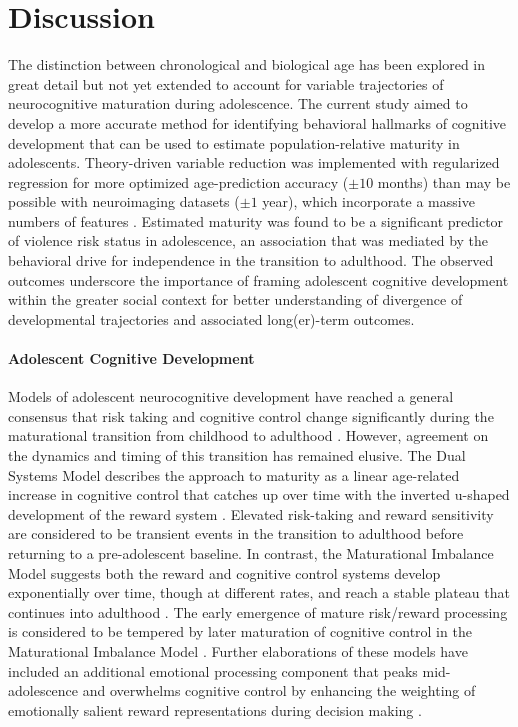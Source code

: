 \documentclass[utf8]{frontiersSCNS} %
\begin{document}
\section{Discussion} The distinction between chronological and biological age has been explored in great detail but not yet extended to account for variable trajectories of neurocognitive maturation during adolescence. The current study aimed to develop a more accurate method for identifying behavioral hallmarks of cognitive development that can be used to estimate population-relative maturity in adolescents. Theory-driven variable reduction was implemented with regularized regression for more optimized age-prediction accuracy ($\pm 10$ months) than may be possible with neuroimaging datasets ($\pm1$ year), which incorporate a massive numbers of features \citep{cole2017predicting, franke2012brain}. Estimated maturity was found to be a significant predictor of violence risk status in adolescence, an association that was mediated by the behavioral drive for independence in the transition to adulthood. The observed outcomes underscore the importance of framing adolescent cognitive development within the greater social context for better understanding of divergence of developmental trajectories and associated long(er)-term outcomes.
\vspace{4pt}
\paragraph*{Adolescent Cognitive Development} Models of adolescent neurocognitive development have reached a general consensus that risk taking and cognitive control change significantly during the maturational transition from childhood to adulthood \citep{Steinberg2010}. However, agreement on the dynamics and timing of this transition has remained elusive. The Dual Systems Model describes the approach to maturity as a linear age-related increase in cognitive control that catches up over time with the inverted u-shaped development of the reward system \citep{Steinberg2005}. Elevated risk-taking and reward sensitivity are considered to be transient events in the transition to adulthood before returning to a pre-adolescent baseline. In contrast, the Maturational Imbalance Model suggests both the reward and cognitive control systems develop exponentially over time, though at different rates, and reach a stable plateau that continues into adulthood \citep{CaseyEtAl2008}. The early emergence of mature risk/reward processing is considered to be tempered by later maturation of cognitive control in the Maturational Imbalance Model \citep{somerville2010developmental}. Further elaborations of these models have included an additional emotional processing component that peaks mid-adolescence and overwhelms cognitive control by enhancing the weighting of emotionally salient reward representations during decision making \citep{casey2019development}.
\vspace{4pt}
\end{document}
